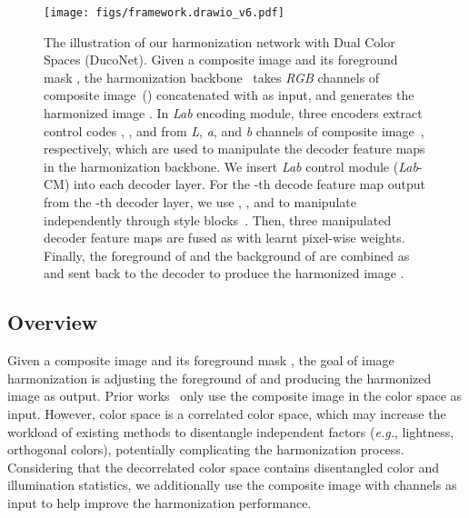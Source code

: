 \documentclass[sigconf]{acmart}
\begin{document}
\begin{figure*}[ht]
  \centering
  \texttt{[image: figs/framework.drawio\_v6.pdf]}
  \caption{The illustration of our harmonization network with Dual Color Spaces (DucoNet). 
  Given a composite image  and its foreground mask , the harmonization backbone~\cite{issam} takes \textit{RGB} channels of composite image~() concatenated with  as input, and generates the harmonized image . 
  In \textit{Lab} encoding module, three encoders extract control codes , , and  from \textit{L}, \textit{a}, and \textit{b} channels of composite image~, respectively,
  which are used to manipulate the decoder feature maps in the harmonization backbone. 
  We insert \textit{Lab} control module (\textit{Lab}-CM) into each decoder layer. For the -th decode feature map  output from the -th decoder layer, 
  we use , , and  to manipulate  independently through style blocks~\cite{styleganv2}. 
  Then, three manipulated decoder feature maps are fused as  with learnt pixel-wise weights. 
  Finally, the foreground of  and the background of  are combined as  and sent back to the decoder to produce the harmonized image .}
  \Description{}
  \label{fig:framework}
\end{figure*}


\subsection{Overview}\label{Overview}

Given a composite image  and its foreground mask , the goal of image harmonization is adjusting the foreground of  and producing the harmonized image  as output. 
Prior works~\cite{issam, CDTNet, dovenet, harmonizer, IHT} only use the composite image in the  color space as input. 
However,  color space is a correlated color space, which may increase the workload of existing methods to disentangle independent factors (\emph{e.g.}, lightness, orthogonal colors), potentially complicating the harmonization process.
Considering that the decorrelated  color space contains disentangled color and illumination statistics, we additionally use the composite image with  channels as input to help improve the  harmonization performance. 
\end{document}
